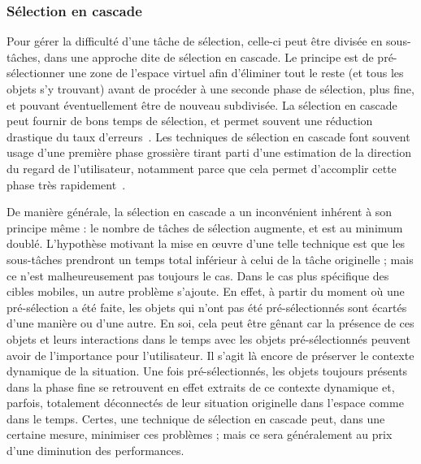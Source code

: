 	\subsubsection{Sélection en cascade}
    Pour gérer la difficulté d'une tâche de sélection, celle-ci peut être divisée en sous-tâches, dans une approche dite de sélection en cascade. Le principe est de pré-sélectionner une zone de l'espace virtuel afin d'éliminer tout le reste (et tous les objets s'y trouvant) avant de procéder à une seconde phase de sélection, plus fine, et pouvant éventuellement être de nouveau subdivisée. La sélection en cascade peut fournir de bons temps de sélection, et permet souvent une réduction drastique du taux d'erreurs~\cite{kopper2011rapid}. Les techniques de sélection en cascade font souvent usage d'une première phase grossière tirant parti d'une estimation de la direction du regard de l'utilisateur, notamment parce que cela permet d'accomplir cette phase très rapidement~\cite{debarba2013disambiguation}.
    
    De manière générale, la sélection en cascade a un inconvénient inhérent à son principe même : le nombre de tâches de sélection augmente, et est au minimum doublé. L'hypothèse motivant la mise en \oe{}uvre d'une telle technique est que les sous-tâches prendront un temps total inférieur à celui de la tâche originelle ; mais ce n'est malheureusement pas toujours le cas. Dans le cas plus spécifique des cibles mobiles, un autre problème s'ajoute. En effet, à partir du moment où une pré-sélection a été faite, les objets qui n'ont pas été pré-sélectionnés sont écartés d'une manière ou d'une autre. En soi, cela peut être gênant car la présence de ces objets et leurs interactions dans le temps avec les objets pré-sélectionnés peuvent avoir de l'importance pour l'utilisateur. Il s'agit là encore de préserver le contexte dynamique de la situation. Une fois pré-sélectionnés, les objets toujours présents dans la phase fine se retrouvent en effet extraits de ce contexte dynamique et, parfois, totalement déconnectés de leur situation originelle dans l'espace comme dans le temps. Certes, une technique de sélection en cascade peut, dans une certaine mesure, minimiser ces problèmes ; mais ce sera généralement au prix d'une diminution des performances.
    
